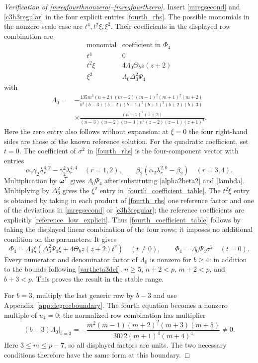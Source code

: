 \documentclass[10pt,a4paper]{amsart}
\begin{document}
\begin{proof}[Verification of \eqref{mregfourthnonzero}--\eqref{mregfourthzero}]
Insert \eqref{mregsecond} and \eqref{c3h3regular} in the four explicit
entries \eqref{fourth_rhs}.  The possible monomials in the nonzero-scale
case are $t^4,t^2\xi,\xi^2$.  Their coefficients in the displayed row
combination are
\begin{equation}\label{fourth_coefficient_table}
\begin{array}{c|c}
 \text{monomial}&\text{coefficient in }\Phi_4\\ \hline
 t^4&0\\
 t^2\xi&4\Lambda_0\Theta_bz(z+2)\\
 \xi^2&\Lambda_0\Delta_3^2\Psi_4
\end{array}
\end{equation}
with
\begin{equation*}
 \begin{split}
 \Lambda_0={}&-\frac{135m^3(n+2)(m-2)(m-1)^2(m+1)^2(m+2)}
 {b^3(b-3)(b-2)(b-1)^3(b+1)^3(b+2)(b+3)}\\
 &\times\frac{(n+1)^2(z+2)}
 {(n-3)(n-2)(n-1)n^5(z-2)(z-1)(z+1)^4}.
\end{split}
\end{equation*}
Here the zero entry also follows without expansion: at $\xi=0$ the
four right-hand sides are those of the known reference solution.
For the quadratic coefficient, set $t=0$.  The coefficient of
$\sigma^2$ in \eqref{fourth_rhs} is the four-component vector with
entries
\[
 \alpha_2\gamma_2\lambda_r^{4,2}
   -\gamma_2^2\lambda_r^{4,4}\quad(r=1,2),
 \qquad \beta_2(\alpha_2\lambda_r^{2,0}-\beta_2)\quad(r=3,4).
\]
Multiplication by $\boldsymbol\omega^{\mathsf T}$ gives
$\Lambda_0\Psi_4$ after substituting
\eqref{alpha2beta2} and \eqref{lambda}.  Multiplying by $\Delta_3^2$
gives the $\xi^2$ entry in \eqref{fourth_coefficient_table}.
The $t^2\xi$ entry is obtained by taking in each product of
\eqref{fourth_rhs} one reference factor and one of the deviations in
\eqref{mregsecond} or \eqref{c3h3regular}; the reference coefficients
are explicitly \eqref{reference_low_explicit}.  Thus
\eqref{fourth_coefficient_table} follows by taking the displayed
linear combination of the four rows; it imposes no additional condition
on the parameters.
It gives
\[
 \Phi_4=\Lambda_0\xi
       (\Delta_3^2\Psi_4\xi+4\Theta_bz(z+2)t^2)
 \quad(t\ne0),\qquad
 \Phi_4=\Lambda_0\Psi_4\sigma^2\quad(t=0).
\]
Every numerator and denominator factor of $\Lambda_0$ is nonzero
for $b\ge4$: in addition to the bounds following \eqref{vartheta3def},
$n\ge5$, $n+2<p$, $m+2<p$, and $b+3<p$.  This proves the result
in the stable range.

For $b=3$, multiply the last generic row by $b-3$ and use
Appendix~\ref{app:degreeboundary}.  The fourth equation becomes a nonzero
multiple of $u_4=0$; the normalized row combination has multiplier
\[
 \left.(b-3)\Lambda_0\right|_{b=3}
 =-\frac{m^2(m-1)(m+2)^2(m+3)(m+5)}
          {3072(m+1)^4(m+4)^4}\ne0.
\]
Here $3\le m\le p-7$, so all displayed factors are units.
The two necessary conditions therefore have the same form at this
boundary.
\end{proof}
\end{document}
